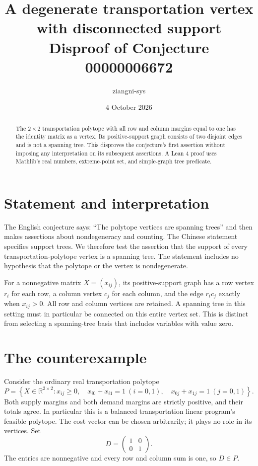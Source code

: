 \documentclass[11pt]{article}
\title{A degenerate transportation vertex with disconnected support\\\large Disproof of Conjecture 00000006672}
\author{ziangni-sys}
\date{4 October 2026}
\newcommand{\R}{\mathbb R}
\begin{document}
\maketitle
\begin{abstract}
The $2\times2$ transportation polytope with all row and column margins equal to one has the identity matrix as a vertex. Its positive-support graph consists of two disjoint edges and is not a spanning tree. This disproves the conjecture's first assertion without imposing any interpretation on its subsequent assertions. A Lean 4 proof uses Mathlib's real numbers, extreme-point set, and simple-graph tree predicate.
\end{abstract}

\section{Statement and interpretation}
The English conjecture says: ``The polytope vertices are spanning trees'' and then makes assertions about nondegeneracy and counting. The Chinese statement specifies support trees. We therefore test the assertion that the support of every transportation-polytope vertex is a spanning tree. The statement includes no hypothesis that the polytope or the vertex is nondegenerate.

For a nonnegative matrix $X=(x_{ij})$, its positive-support graph has a row vertex $r_i$ for each row, a column vertex $c_j$ for each column, and the edge $r_ic_j$ exactly when $x_{ij}>0$. All row and column vertices are retained. A spanning tree in this setting must in particular be connected on this entire vertex set. This is distinct from selecting a spanning-tree basis that includes variables with value zero.

\section{The counterexample}
Consider the ordinary real transportation polytope
\[
 P=\left\{X\in\R^{2\times2}:
 x_{ij}\geq0,\quad
 x_{i0}+x_{i1}=1\ (i=0,1),\quad
 x_{0j}+x_{1j}=1\ (j=0,1)\right\}.
\]
Both supply margins and both demand margins are strictly positive, and their totals agree. In particular this is a balanced transportation linear program's feasible polytope. The cost vector can be chosen arbitrarily; it plays no role in its vertices. Set
\[
 D=\begin{pmatrix}1&0\\0&1\end{pmatrix}.
\]
The entries are nonnegative and every row and column sum is one, so $D\in P$.
\end{document}

